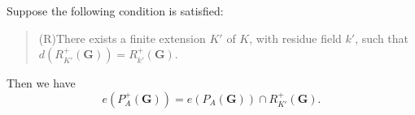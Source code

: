 Suppose the following condition is satisfied:
\begin{quote}
(R)\quad There exists a finite extension $K'$ of $K$, with residue field $k'$, such that $d(R_{K'}^+(\mathbf{G})) = R_{k'}^+(\mathbf{G})$.
\end{quote}
Then we have
$$e(P_A^+(\mathbf{G})) = e(P_A(\mathbf{G})) \cap R_{K'}^+(\mathbf{G}).$$
